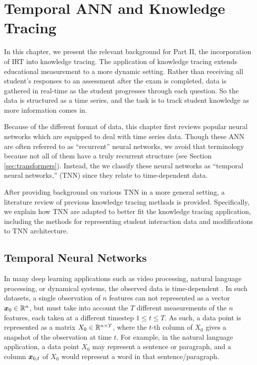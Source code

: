 \chapter{Temporal ANN and Knowledge Tracing}\label{ch:kt_background}
In this chapter, we present the relevant background for Part II, the incorporation of IRT into knowledge tracing. The application of knowledge tracing extends educational measurement to a more dynamic setting. Rather than receiving all student's responses to an assessment after the exam is completed, data is gathered in real-time as the student progresses through each question. So the data is structured as a time series, and the task is to track student knowledge as more information comes in.

Because of the different format of data, this chapter first reviews popular neural networks which are equipped to deal with time series data. Though these ANN are often referred to as ``recurrent'' neural networks, we avoid that terminology because not all of them have a truly recurrent structure (see Section \ref{sec:transformers}). Instead, the we classify these neural networks as ``temporal neural networks,'' (TNN) since they relate to time-dependent data.

After providing background on various TNN in a more general setting, a literature review of previous knowledge tracing methods is provided. Specifically, we explain how TNN are adapted to better fit the knowledge tracing application, including the methods for representing student interaction data and modifications to TNN architecture.

\section*{Temporal Neural Networks}
In many deep learning applications such as video processing, natural language processing, or dynamical systems, the observed data is time-dependent \cite{kahou2015, gilpin2020, vaswani2017}. In such datasets, a single observation of $n$ features can not represented as a vector $\boldsymbol{x}_0 \in \mathbb{R}^n$, but must take into account the $T$ different measurements of the $n$ features, each taken at a different timestep $1 \leq t \leq T$. As such, a data point is represented as a matrix $X_0 \in \mathbb{R}^{n \times T}$, where the $t$-th column of $X_0$ gives a snapshot of the observation at time $t$. For example, in the natural language application, a data point $X_0$ may represent a sentence or paragraph, and a column $\boldsymbol{x}_{0,t}$ of $X_0$ would represent a word in that sentence/paragraph.

